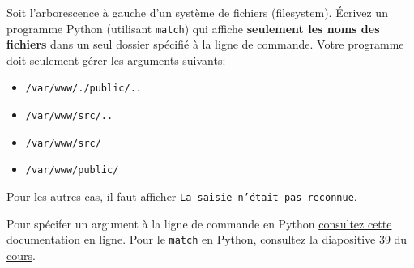 \begin{Exercice}[5 minutes]

\noindent
\begin{minipage}[t]{0.5\textwidth}
\vspace{0pt}
\begin{tcolorbox}[width=2in,colframe=black, boxrule=1pt, left=0pt, right=0pt, top=0pt, bottom=0pt]
\end{tcolorbox}
\end{minipage}%
\hspace{-1.5cm}
\begin{minipage}[t]{0.6\textwidth}
\vspace{0pt}
Soit l'arborescence à gauche d'un système de fichiers (filesystem).
Écrivez un programme Python (utilisant \texttt{match}) qui affiche \textbf{seulement les noms des fichiers} dans un seul dossier spécifié à la ligne de commande. 
Votre programme doit seulement gérer les arguments suivants: \newline 

\begin{itemize}
    \item[$\bullet$] \texttt{/var/www/./public/..}
    \item[$\bullet$] \texttt{/var/www/src/..}
    \item[$\bullet$] \texttt{/var/www/src/}
    \item[$\bullet$] \texttt{/var/www/public/} \newline 
\end{itemize}

Pour les autres cas, il faut afficher \texttt{La saisie n'était pas reconnue}.  
\end{minipage}
\begin{conseil}
Pour spécifer un argument à la ligne de commande en Python \href{https://docs.python.org/fr/3.13/library/sys.html\#sys.argv}{consultez cette documentation en ligne}. Pour le \texttt{match} en Python, consultez \href{https://moodle.unil.ch/pluginfile.php/3532635/mod_resource/content/5/3\%20\%E2\%80\%93\%20Programming\%20Basics.pdf}{la diapositive 39 du cours}. 
\end{conseil}



\end{Exercice}
